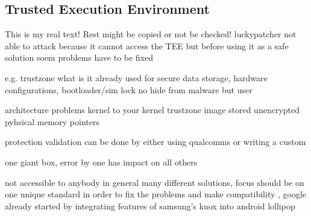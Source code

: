 \subsection{Trusted Execution Environment}\label{subsection:evaluation-external-tee}
This is my real text! Rest might be copied or not be checked!
luckypatcher not able to attack because it cannot access the TEE but before using it as a safe solution soem problems have to be fixed

%
e.g. trustzone
what is it already used for
secure data storage, hardware configurations, bootloader/sim lock
no hide from malware but user

architecture problems
kernel to your kernel
trustzone image stored unencrypted
pyhsical memory pointers

protection
validation can be done by either using qualcomms or writing a custom

one giant box, error by one has impact on all others

\cite{dragonTZ}\cite{armTz}
%

not accessible to anybody
in general many different solutions, focus should be on one unique standard in order to fix the problems and make compatibility , google already started by integrating features of samsung's knox into android lollipop \cite{samsungKnox}
